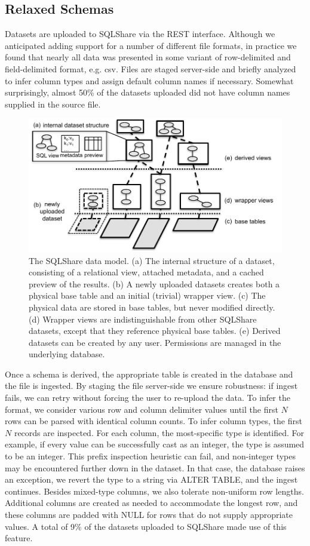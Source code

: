 \documentclass{sig-alternate}
\newcommand{\sqlshare}{SQLShare}
\begin{document}
\subsection{Relaxed Schemas} 
Datasets are uploaded to \sqlshare{} via the REST interface. Although we anticipated adding support for a number of different file formats, in practice we found that nearly all data was presented in some variant of row-delimited and field-delimited format, e.g. csv. Files are staged server-side and briefly analyzed to infer column types and assign default column names if necessary.  Somewhat surprisingly, almost 50\% of the datasets uploaded did not have column names supplied in the source file. 
\begin{figure}[h]
\centering
\includegraphics[width=0.9\columnwidth]{datamodel.pdf}
\caption{The \sqlshare{} data model. (a) The internal structure of a dataset, consisting of a relational view, attached metadata, and a cached preview of the results. (b) A newly uploaded datasets creates both a physical base table and an initial (trivial) wrapper view. (c) The physical data are stored in base tables, but never modified directly. (d) Wrapper views are indistinguishable from other \sqlshare{} datasets, except that they reference physical base tables. (e) Derived datasets can be created by any user. Permissions are managed in the underlying database.}
\label{fig:datamodel}
\end{figure}
Once a schema is derived, the appropriate table is created in the database and the file is ingested.  By staging the file server-side we ensure robustness: if ingest fails, we can retry without forcing the user to re-upload the data.  To infer the format, we consider various row and column delimiter values until the first $N$ rows can be parsed with identical column counts.  To infer column types, the first $N$ records are inspected. 
For each column, the most-specific type is identified.  For example, if every value can be successfully cast as an integer, the type is assumed to be an integer.  This prefix inspection heuristic can fail, and non-integer types may be encountered further down in the dataset.  
In that case, the database raises an exception, we revert the type to a string via ALTER TABLE, and the ingest continues.  
Besides mixed-type columns, we also tolerate non-uniform row lengths. Additional columns are created as needed to accommodate the longest row, and these columns are padded with NULL for rows that do not supply appropriate values. A total of 9\% of the datasets uploaded to \sqlshare{} made use of this feature. 
\end{document}
